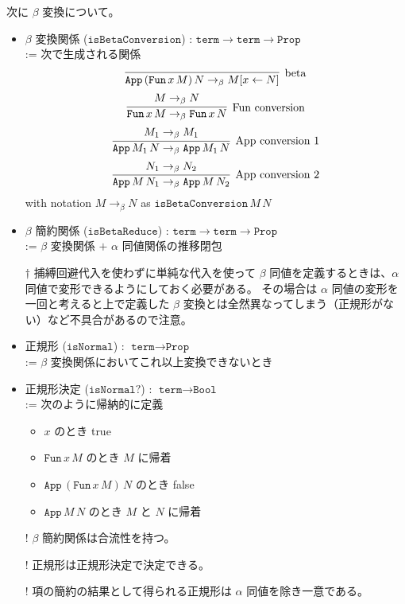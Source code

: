 \documentclass[dvipdfmx]{jsarticle}
\begin{document}
次に \(\beta\) 変換について。
\begin{itemize}
  \item \(\beta\) 変換関係 (\(\texttt{isBetaConversion}\)) : \(\texttt{term} \to \texttt{term} \to \texttt{Prop}\) \\
    := 次で生成される関係
      \[\infer[\text{beta}]{\texttt{App} \, (\texttt{Fun} \, x \, M) \, N \to_{\beta} M[x \leftarrow N]}{}\]
      \[\infer[\text{Fun conversion}]{\texttt{Fun} \, x \, M \to_{\beta} \texttt{Fun} \, x \, N}{M \to_{\beta} N}\]
      \[\infer[\text{App conversion 1}]{\texttt{App} \, M_1 \, N \to_{\beta} \texttt{App} \, M_1 \, N}{M_1 \to_{\beta} M_1}\]
      \[\infer[\text{App conversion 2}]{\texttt{App} \, M \, N_1 \to_{\beta} \texttt{App} \, M \, N_2}{N_1 \to_{\beta} N_2}\]
    with notation \(M \to_{\beta} N\) as \(\texttt{isBetaConversion} \, M \, N\)
  \item \(\beta\) 簡約関係 (\(\texttt{isBetaReduce}\)) : \(\texttt{term} \to \texttt{term} \to \texttt{Prop}\) \\
    := \(\beta\) 変換関係 \(+\) \(\alpha\) 同値関係の推移閉包
  \item[\(\dagger\)] 捕縛回避代入を使わずに単純な代入を使って \(\beta\) 同値を定義するときは、\(\alpha\) 同値で変形できるようにしておく必要がある。
    その場合は \(\alpha\) 同値の変形を一回と考えると上で定義した \(\beta\) 変換とは全然異なってしまう（正規形がない）など不具合があるので注意。
  \item 正規形 (\(\texttt{isNormal}\)) : \(\texttt{term} \to \texttt{Prop}\) \\
    := \(\beta\) 変換関係においてこれ以上変換できないとき
  \item 正規形決定 (\(\texttt{isNormal?}\)) : \(\texttt{term} \to \texttt{Bool}\) \\
    := 次のように帰納的に定義
    \begin{itemize}
      \item \(x\) のとき true
      \item \(\texttt{Fun} \, x \, M\) のとき \(M\) に帰着
      \item \(\texttt{App} \, (\texttt{Fun} \, x \, M) \, N\) のとき false
      \item \(\texttt{App} \, M \, N\) のとき \(M\) と \(N\) に帰着
    \end{itemize}
  \item[!] \(\beta\) 簡約関係は合流性を持つ。
  \item[!] 正規形は正規形決定で決定できる。
  \item[!] 項の簡約の結果として得られる正規形は \(\alpha\) 同値を除き一意である。

\end{itemize}
\end{document}
